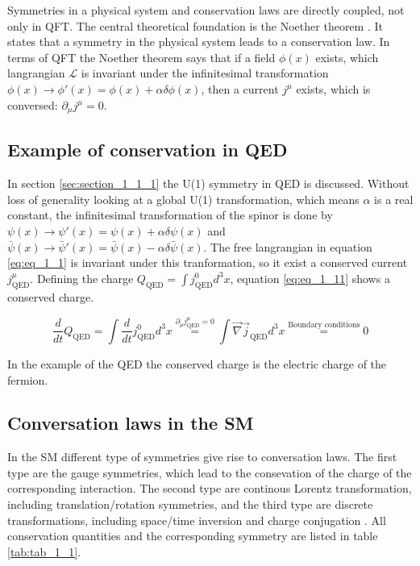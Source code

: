 Symmetries in a physical system and conservation laws are directly coupled, not only in \gls{QFT}. The central theoretical foundation is the Noether theorem \cite{NOTHERTHEOREM}. It states that a symmetry in the physical system leads to a conservation law. In terms of \gls{QFT} the Noether theorem says that if a field $\phi(x)$ exists, which langrangian $\mathcal{L}$ is invariant under the infinitesimal transformation $\phi(x) \rightarrow \phi'(x) = \phi(x) + \alpha \delta \phi(x)$, then a current $j^{\mu}$ exists, which is conversed: $\partial_{\mu}j^{\mu} = 0$.  

\subsection{Example of conservation in \gls{QED}}
\label{sec:section_1_2_1}

In section \ref{sec:section_1_1_1} the U(1) symmetry in \gls{QED} is discussed. Without loss of generality looking at a global U(1) transformation, which means $\alpha$ is a real constant, the infinitesimal transformation of the spinor is done by $\psi(x) \rightarrow \psi'(x) = \psi(x) + \alpha \delta \psi(x)$ and  $\bar{\psi}(x) \rightarrow \bar{\psi}'(x) = \bar{\psi}(x) - \alpha \delta \bar{\psi}(x)$. The free langrangian in equation \ref{eq:eq_1_1} is invariant under this tranformation, so it exist a conserved current $j_{\text{QED}}^{\mu}$. Defining the charge $Q_{\text{QED}} = \int j^{0}_{\text{QED}} d^{3}x$, equation \ref{eq:eq_1_11} shows a conserved charge. 

\begin{equation}
	\label{eq:eq_1_11}
	\frac{d}{dt} Q_{\text{QED}} = \int \frac{d}{dt}j^{0}_{\text{QED}}d^{3}x \overset{\partial_{\mu}j_{\text{QED}}^{\mu} = 0}{=} \int \vec{\nabla} \vec{j}_{\text{QED}}d^{3}x \overset{\text{Boundary conditions}}{=} 0
\end{equation}

In the example of the \gls{QED} the conserved charge is the electric charge of the fermion.

\subsection{Conversation laws in the \gls{SM}}
\label{sec:section_1_2_2}

In the \gls{SM} different type of symmetries give rise to conversation laws. The first type are the gauge symmetries, which lead to the consevation of the charge of the corresponding interaction. The second type are continous Lorentz transformation, including translation/rotation symmetries, and the third type are discrete transformations, including space/time inversion and charge conjugation \cite{Peskin}. All conservation quantities and the corresponding symmetry are listed in table \ref{tab:tab_1_1}.

